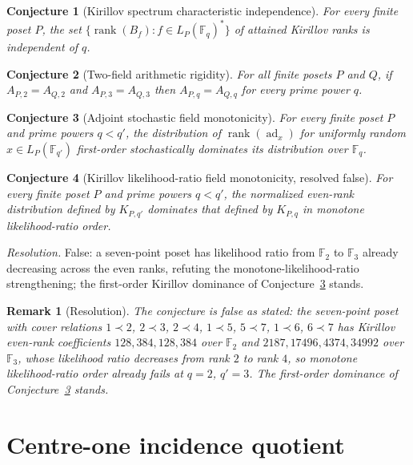 \documentclass[11pt]{article}
\newtheorem{conjecture}{Conjecture}
\newtheorem{remark}{Remark}
\theoremstyle{definition}
\newcommand{\rank}{\operatorname{rank}}
\newcommand{\Fq}{\mathbb F}
\begin{document}
\begin{conjecture}[Kirillov spectrum characteristic independence]\label{v8}
For every finite poset $P$, the set $\{\rank(B_f):f\in L_P(\Fq_q)^*\}$ of attained Kirillov ranks is independent of $q$.
\end{conjecture}

\begin{conjecture}[Two-field arithmetic rigidity]\label{v9}
For all finite posets $P$ and $Q$, if $A_{P,2}=A_{Q,2}$ and $A_{P,3}=A_{Q,3}$ then $A_{P,q}=A_{Q,q}$ for every prime power $q$.
\end{conjecture}

\begin{conjecture}[Adjoint stochastic field monotonicity]\label{v10}
For every finite poset $P$ and prime powers $q<q'$, the distribution of $\rank(\operatorname{ad}_x)$ for uniformly random $x\in L_P(\Fq_{q'})$ first-order stochastically dominates its distribution over $\Fq_q$.
\end{conjecture}

\begin{conjecture}[Kirillov likelihood-ratio field monotonicity, resolved false]\label{v11}
For every finite poset $P$ and prime powers $q<q'$, the normalized even-rank distribution defined by $K_{P,q'}$ dominates that defined by $K_{P,q}$ in monotone likelihood-ratio order.
\end{conjecture}

\emph{Resolution.} False: a seven-point poset has likelihood ratio from $\Fq_2$ to $\Fq_3$ already decreasing across the even ranks, refuting the monotone-likelihood-ratio strengthening; the first-order Kirillov dominance of Conjecture~\ref{v10} stands.

\begin{remark}[Resolution]
The conjecture is false as stated: the seven-point poset with cover relations $1\prec2$, $2\prec3$, $2\prec4$, $1\prec5$, $5\prec7$, $1\prec6$, $6\prec7$ has Kirillov even-rank coefficients $128,384,128,384$ over $\Fq_2$ and $2187,17496,4374,34992$ over $\Fq_3$, whose likelihood ratio decreases from rank $2$ to rank $4$, so monotone likelihood-ratio order already fails at $q=2$, $q'=3$.  The first-order dominance of Conjecture~\ref{v10} stands.
\end{remark}

\section{Centre-one incidence quotient}
\end{document}
